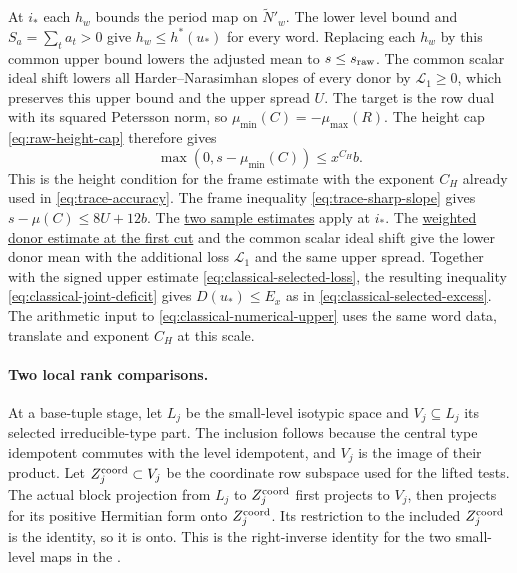 At \(i_*\) each \(h_w\) bounds the period map on
\(\widetilde N'_w\). The lower level bound and \(S_a=\sum_t a_t>0\)
give \(h_w\le h^*(u_*)\) for every word. Replacing each \(h_w\) by
this common upper bound lowers the adjusted mean to
\(s\le s_{\rm raw}\). The common scalar ideal shift lowers all
Harder--Narasimhan slopes of every donor by \(\mathscr L_1\ge0\),
which preserves this upper bound and the upper spread \(U\).
The target is the row dual with its squared Petersson norm, so
\(\mu_{\min}(C)=-\mu_{\max}(R)\). The height cap
\eqref{eq:raw-height-cap} therefore gives
\[
 \max(0,s-\mu_{\min}(C))\le x^{C_H}b .
\]
This is the height condition for the frame estimate with the exponent
\(C_H\) already used in \eqref{eq:trace-accuracy}.
The frame inequality \eqref{eq:trace-sharp-slope} gives
\(s-\mu(C)\le 8U+12b\). The
\hyperlink{proof.selection-realized-samples}{two sample estimates}
apply at \(i_*\). The
\hyperlink{proof.classical-donor-weighted-index}{weighted donor estimate at the first cut}
and the common scalar ideal shift give the lower donor mean with
the additional loss \(\mathscr L_1\) and the same upper spread.
Together with the signed upper estimate
\eqref{eq:classical-selected-loss}, the resulting inequality
\eqref{eq:classical-joint-deficit} gives \(D(u_*)\le E_x\)
as in \eqref{eq:classical-selected-excess}. The arithmetic input
to \eqref{eq:classical-numerical-upper} uses the same word data,
translate and exponent \(C_H\) at this scale.

\paragraph{Two local rank comparisons.}
\label{sec:window-local-ranks}
At a base-tuple stage, let \(L_j\) be the small-level isotypic
space and \(V_j\subseteq L_j\) its selected irreducible-type
part. The inclusion follows because the central type idempotent
commutes with the level idempotent, and \(V_j\) is the image of
their product. Let \(Z_j^{\rm coord}\subset V_j\) be the coordinate
row subspace used for the lifted tests. The actual block projection
from \(L_j\) to \(Z_j^{\rm coord}\) first projects to \(V_j\), then
projects for its positive Hermitian form onto \(Z_j^{\rm coord}\).
Its restriction to the included \(Z_j^{\rm coord}\) is the identity,
so it is onto. This is the right-inverse identity for the two
small-level maps in the
.

